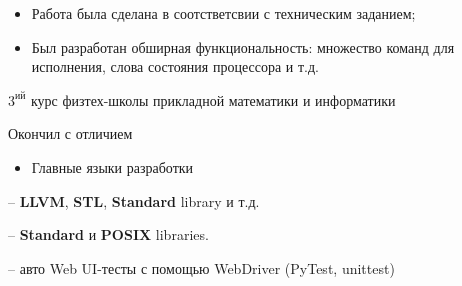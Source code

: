 \documentclass[10pt,a4paper,ragged2e,withhyper]{custom-altacv}
\begin{document}
\begin{paracol}{2}
\begin{itemize}
	\item Работа была сделана в соотстветсвии с техническим заданием;
	\item Был разработан обширная функциональность: множество команд для исполнения, слова состояния процессора и т.д.
\end{itemize}










\switchcolumn


$3^\text{ий}$ курс физтех-школы прикладной математики и информатики

\divider

Окончил с отличием




\begin{itemize}
	\item \textcolor{emphasis}{Главные языки разработки} 
\end{itemize}

 -- \textbf{LLVM}, \textbf{STL}, \textbf{Standard} library и т.д.
\vspace{1ex}

 -- \textbf{Standard} и \textbf{POSIX} libraries.
\vspace{1ex}

 -- авто Web UI-тесты с помощью WebDriver (PyTest, unittest)
\vspace{1ex}


\end{paracol}
\end{document}
